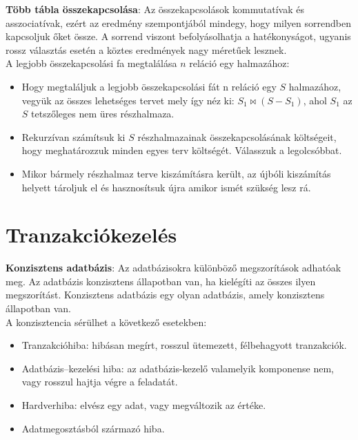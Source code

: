 \documentclass[margin=0px]{article}
\begin{document}
\noindent \textbf{Több tábla összekapcsolása}: Az összekapcsolások kommutatívak és asszociatívak, ezért az eredmény szempontjából
mindegy, hogy milyen sorrendben kapcsoljuk őket össze. A sorrend viszont befolyásolhatja a hatékonyságot, ugyanis rossz választás
esetén a köztes eredmények nagy méretűek lesznek.\\

\noindent A legjobb összekapcsolási fa megtalálása $n$ reláció egy halmazához:
\begin{itemize}
    \item	Hogy megtaláljuk a legjobb összekapcsolási fát n reláció egy $S$ halmazához,
          vegyük az összes lehetséges tervet mely így néz ki: $S_{1} \Join (S - S_{1})$, ahol $S_{1}$ az $S$ tetszőleges nem üres részhalmaza.

    \item	Rekurzívan számítsuk ki $S$ részhalmazainak összekapcsolásának költségeit, hogy meghatározzuk minden egyes terv költségét. Válasszuk a legolcsóbbat.

    \item	Mikor bármely részhalmaz terve kiszámításra került, az újbóli kiszámítás helyett tároljuk el és hasznosítsuk újra amikor ismét szükség lesz rá.
\end{itemize}

\section{Tranzakciókezelés}

\noindent \textbf{Konzisztens adatbázis}: Az adatbázisokra különböző megszorítások adhatóak meg. Az adatbázis konzisztens állapotban
van, ha kielégíti az összes ilyen megszorítást. Konzisztens adatbázis egy olyan adatbázis, amely konzisztens állapotban van.\\

\noindent A konzisztencia sérülhet a következő esetekben:
\begin{itemize}
    \item	Tranzakcióhiba: hibásan megírt, rosszul ütemezett, félbehagyott tranzakciók.
    \item	Adatbázis--kezelési hiba: az adatbázis-kezelő valamelyik komponense nem, vagy rosszul hajtja végre a feladatát.
    \item	Hardverhiba: elvész egy adat, vagy megváltozik az értéke.
    \item	Adatmegosztásból származó hiba.
\end{itemize}
\end{document}
